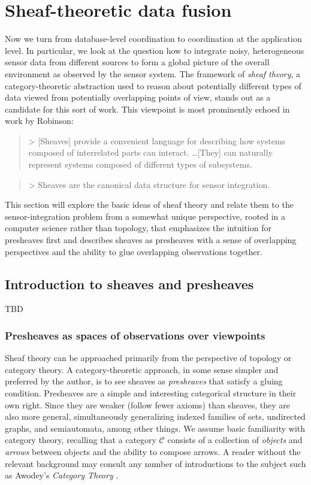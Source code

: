 \section{Sheaf-theoretic data fusion}
\label{sec:sheaf}

Now we turn from database-level coordination to coordination at the application level. In particular, we look at the question how to integrate noisy, heterogeneous sensor data from different sources to form a global picture of the overall environment as observed by the sensor system. The framework of \emph{sheaf theory}, a category-theoretic abstraction used to reason about potentially different types of data viewed from potentially overlapping points of view, stands out as a candidate for this sort of work. This viewpoint is most prominently echoed in work by Robinson:
\begin{quote}
>   [Sheaves] provide a convenient language for describing how systems composed of interrelated parts can interact. \ldots [They] can naturally represent systems composed of different types of subsystems. \cite{2020robinsonPseudometric}
\end{quote}
\begin{quote}
>   Sheaves are the canonical data structure for sensor integration. \cite{2017robinsonCanonical}
\end{quote}
This section will explore the basic ideas of sheaf theory and relate them to the sensor-integration problem from a somewhat unique perspective, rooted in a computer science rather than topology, that emphasizes the intuition for presheaves first and describes sheaves as presheaves with a sense of overlapping perspectives and the ability to glue overlapping observations together.

\subsection{Introduction to sheaves and presheaves} 

TBD

\subsubsection{Presheaves as spaces of observations over viewpoints}

Sheaf theory can be approached primarily from the perspective of topology or category theory. A category-theoretic approach, in some sense simpler and preferred by the author, is to see sheaves as \emph{presheaves} that satisfy a gluing condition. Presheaves are a simple and interesting categorical structure in their own right. Since they are weaker (follow fewer axioms) than sheaves, they are also more general, simultaneously generalizing indexed families of sets, undirected graphs, and semiautomata, among other things. We assume basic familiarity with category theory, recalling that a category $\mathcal{C}$ consists of a collection of \emph{objects} and \emph{arrows} between objects and the ability to compose arrows. A reader without the relevant background may consult any number of introductions to the subject such as Awodey's \emph{Category Theory} \cite{10.5555/2060081}.


